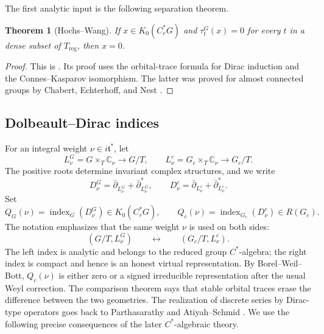 \documentclass[11pt]{amsart}
\newtheorem{theorem}{Theorem}[section]
\theoremstyle{definition}
\theoremstyle{remark}
\newcommand{\C}{\mathbb C}
\newcommand{\Cr}{C_r^*}
\newcommand{\reg}{\mathrm{reg}}
\newcommand{\indexop}{\operatorname{index}}
\begin{document}
The first analytic input is the following separation theorem.

\begin{theorem}[Hochs--Wang]\label{thm:separation}
If $x\in K_0(\Cr G)$ and $\tau_t^G(x)=0$ for every $t$ in a dense subset of $T_{\reg}$, then $x=0$.
\end{theorem}

\begin{proof}
This is \cite[Corollary~4.1]{HochsWang2019Orbital}.  Its proof uses the orbital-trace formula for Dirac induction and the Connes--Kasparov isomorphism.  The latter was proved for almost connected groups by Chabert, Echterhoff, and Nest \cite{ChabertEchterhoffNest2003}.
\end{proof}

\subsection{Dolbeault--Dirac indices}

For an integral weight $\nu\in i\mathfrak t^*$, let
\[
  L_\nu^G=G\times_T\C_\nu\longrightarrow G/T,
  \qquad
  L_\nu^c=G_c\times_T\C_\nu\longrightarrow G_c/T.
\]
The positive roots determine invariant complex structures, and we write
\[
  D_\nu^G=\bar\partial_{L_\nu^G}+\bar\partial_{L_\nu^G}^*,
  \qquad
  D_\nu^c=\bar\partial_{L_\nu^c}+\bar\partial_{L_\nu^c}^*.
\]
Set
\[
  Q_G(\nu)=\indexop_G(D_\nu^G)\in K_0(\Cr G),
  \qquad
  Q_c(\nu)=\indexop_{G_c}(D_\nu^c)\in R(G_c).
\]
The notation emphasizes that the same weight \(\nu\) is used on both sides:
\[
  (G/T,L_\nu^G)\qquad\longleftrightarrow\qquad(G_c/T,L_\nu^c).
\]
The left index is analytic and belongs to the reduced group \(C^*\)-algebra;
the right index is compact and hence is an honest virtual representation.  By
Borel--Weil--Bott, \(Q_c(\nu)\) is either zero or a signed irreducible
representation after the usual Weyl correction.  The comparison theorem says
that stable orbital traces erase the difference between the two geometries.
The realization of discrete series by Dirac-type operators goes back to Parthasarathy \cite{Parthasarathy1972} and Atiyah--Schmid \cite{AtiyahSchmid1977,AtiyahSchmid1979}.  We use the following precise consequences of the later $C^*$-algebraic theory.
\end{document}
